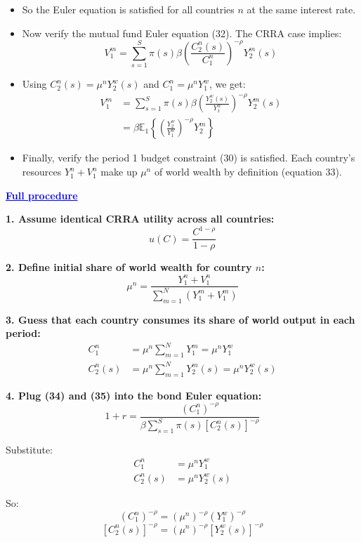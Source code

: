 \documentclass[12pt]{article}
\begin{document}
\begin{itemize}
\begin{itemize}
    \item So the Euler equation is satisfied for all countries \( n \) at the same interest rate.

    \item Now verify the mutual fund Euler equation (32). The CRRA case implies:
    \[
    V_1^m = \sum_{s=1}^{S} \pi(s) \beta \left( \frac{C_2^n(s)}{C_1^n} \right)^{-\rho} Y_2^m(s)
    \]

    \item Using \( C_2^n(s) = \mu^n Y_2^w(s) \) and \( C_1^n = \mu^n Y_1^w \), we get:
    \begin{align*}
        V_1^m &= \sum_{s=1}^{S} \pi(s) \beta \left( \frac{Y_2^w(s)}{Y_1^w} \right)^{-\rho} Y_2^m(s) \\
        &= \beta \mathbb{E}_1 \left\{ \left( \frac{Y_2^w}{Y_1^w} \right)^{-\rho} Y_2^m \right\}
    \end{align*}

    \item Finally, verify the period 1 budget constraint (30) is satisfied. Each country’s resources \( Y_1^n + V_1^n \) make up \( \mu^n \) of world wealth by definition (equation 33).
\end{itemize}

\textcolor{blue}{\textbf{\uline{Full procedure}}}

{\color{blue}
\textbf{1. Assume identical CRRA utility across all countries:}
\[
u(C) = \frac{C^{1 - \rho}}{1 - \rho}
\]

\textbf{2. Define initial share of world wealth for country \( n \):}
\[
\mu^n = \frac{Y_1^n + V_1^n}{\sum_{m=1}^{N}(Y_1^m + V_1^m)} \tag{33}
\]

\textbf{3. Guess that each country consumes its share of world output in each period:}
\begin{align}
C_1^n &= \mu^n \sum_{m=1}^{N} Y_1^m = \mu^n Y_1^w \tag{34} \\
C_2^n(s) &= \mu^n \sum_{m=1}^{N} Y_2^m(s) = \mu^n Y_2^w(s) \tag{35}
\end{align}

\textbf{4. Plug (34) and (35) into the bond Euler equation:}
\[
1 + r = \frac{(C_1^n)^{-\rho}}{\beta \sum_{s=1}^{S} \pi(s)[C_2^n(s)]^{-\rho}} \tag{36}
\]

Substitute:
\begin{align*}
C_1^n &= \mu^n Y_1^w \\
C_2^n(s) &= \mu^n Y_2^w(s)
\end{align*}

So:
\[
(C_1^n)^{-\rho} = (\mu^n)^{-\rho} (Y_1^w)^{-\rho}
\]
\[
[C_2^n(s)]^{-\rho} = (\mu^n)^{-\rho} [Y_2^w(s)]^{-\rho}
\]

}
\end{itemize}
\end{document}
